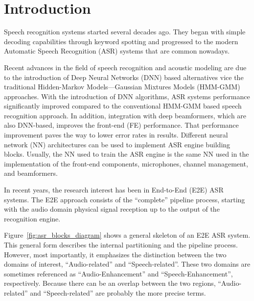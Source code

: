 \chapter{Introduction}
Speech recognition systems
started several decades ago.
They began with simple decoding capabilities through keyword
spotting and progressed to the modern Automatic Speech Recognition (ASR) systems
that are common nowadays\cite{asrBriefHistory}.

Recent advances in the field of speech recognition 
and acoustic modeling are
due to the introduction of 
Deep Neural Networks (DNN) 
based alternatives vice the traditional
Hidden-Markov Models---Gaussian Mixtures Models (HMM-GMM) 
approaches\cite{7472778, 6296526}.
With the introduction of DNN algorithms,
ASR systems performance significantly improved
compared to the conventional HMM-GMM 
based speech recognition approach\cite{7472778, 6296526}.
In addition, integration with deep beamformers,
which are also DNN-based, improves
the front-end (FE) performance.
That performance improvement paves the way 
to lower error rates in results.
Different neural network (NN) 
architectures can be used to
implement ASR engine building blocks.
Usually, the NN used to train the ASR engine 
is the same NN used
in the implementation of the
front-end components, microphones, channel management,
and beamformers.

In recent years, the research
interest has been in 
End-to-End (E2E) ASR systems\cite{boeddeker2018exploring}.
The E2E approach consists of the ``complete'' pipeline process, starting with
the audio domain physical signal reception up to the 
output of the recognition engine.

Figure~\ref{fig:asr_blocks_diagram} shows 
a general skeleton of
an E2E ASR system. This general form describes the
internal partitioning and the pipeline process.
However, most importantly, it emphasizes
the distinction between the two domains of interest,
``Audio-related'' and ``Speech-related''.
These two domains are sometimes referenced
as ``Audio-Enhancement'' and ``Speech-Enhancement'', respectively.
Because there can be an overlap between
the two regions, ``Audio-related'' 
and ``Speech-related'' are probably the more precise terms.

